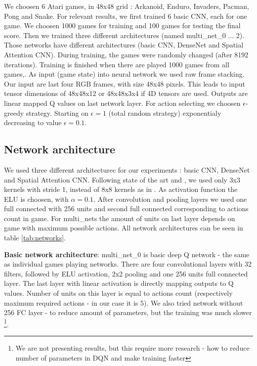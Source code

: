 \documentclass[10pt,a4paper]{article}
\begin{document}
We choosen 6 Atari games, in 48x48 grid : Arkanoid, Enduro, Invaders, Pacman, Pong and Snake.
For relevant results, we first trained 6 basic CNN, each for one game. We choosen 1000 games for training and 100 games for testing the final score.
Then we trained three different architectures (named multi\_net\_0 ... 2). Those networks have different architectures (basic CNN, DenseNet and Spatial Attention CNN).
During training, the games were randomly changed (after 8192 iterations). Training is finished when there are played 1000 games from all games,.
As input (game state) into neural network we used raw frame stacking. Our input are last four RGB frames, with size 48x48 pixels. This leads to input tensor dimensions of 48x48x12 or 48x48x3x4 if
4D tensors are used. Outputs are linear mapped Q values on last network layer.
For action selecting we choosen $\epsilon$-greedy strategy. Starting on $\epsilon = 1$ (total random strategy) exponentialy decreasing to value $\epsilon = 0.1$.

\subsection {Network architecture}
We used three different architecturec for our experiments : basic CNN, DenseNet and Spatial Attention CNN.
Following state of the art \cite{bib:vgg_net} and \cite{bib:resnet_net}, we used only 3x3 kernels with stride 1, instead of 8x8 kernels as in \cite{bib:dqn_atari}.
As activation function the ELU is choosen, with $\alpha = 0.1$. After convolution and pooling layers we used one full connected with 256 units and second
full connected corresponding to actions count in game. For multi\_nets the amount of units on last layer depends on game with maximum possible actions.
All network architectures can be seen in table \ref{tab:networks}.

{\bf Basic network architecture}:
multi\_net\_0 is basic deep Q network - the same as individual games playing networks.
There are four convolutional layers with 32 filters, followed by ELU activation, 2x2 pooling and one 256 units full connected layer.
The last layer with linear activation is directly mapping outputs to Q values. Number of units on this layer is equal to actions count
(respectively maximum required actions - in our case it is 5).
We also tried network without 256 FC layer - to reduce amount of parameters, but the training was much slower \footnote {We are not presenting results, but this require more research - how to reduce number of parameters in DQN and make training faster}.
\end{document}
